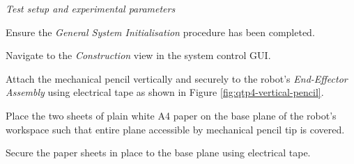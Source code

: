 \textit{Test setup and experimental parameters}

\begin{compactenum}
	\item Ensure the \textit{General System Initialisation} procedure has been completed.
	\item Navigate to the \textit{Construction} view in the system control GUI.
	\item Attach the mechanical pencil vertically and securely to the robot's \textit{End-Effector Assembly} using electrical tape as shown in Figure \ref{fig:qtp4-vertical-pencil}.
	\item Place the two sheets of plain white A4 paper on the base plane of the robot's workspace such that entire plane accessible by mechanical pencil tip is covered.
	\item Secure the paper sheets in place to the base plane using electrical tape.
\end{compactenum}

